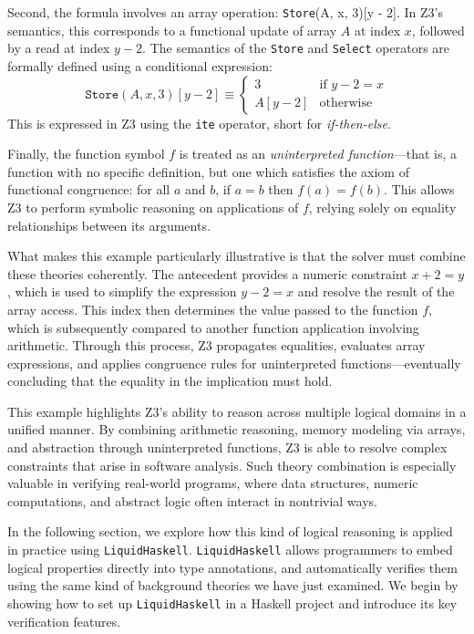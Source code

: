\documentclass[]{rptuseminar}
\begin{document}
Second, the formula involves an array operation: \texttt{Store}(A, x, 3)[y - 2]. In Z3’s semantics, this corresponds to a functional update of array \(A\) at index \(x\), followed by a read at index \(y - 2\). The semantics of the \texttt{Store} and \texttt{Select} operators are formally defined using a conditional expression:
\[
    \texttt{Store}(A, x, 3)[y - 2] \equiv 
    \begin{cases}
    3 & \text{if } y - 2 = x \\
    A[y - 2] & \text{otherwise}
    \end{cases}
\]
This is expressed in Z3 using the \texttt{ite} operator, short for \emph{if-then-else}.

Finally, the function symbol \(f\) is treated as an \emph{uninterpreted function}—that is, a function with no specific definition, but one which satisfies the axiom of functional congruence: for all \(a\) and \(b\), if \(a = b\) then \(f(a) = f(b)\). This allows Z3 to perform symbolic reasoning on applications of \(f\), relying solely on equality relationships between its arguments.

What makes this example particularly illustrative is that the solver must combine these theories coherently. The antecedent provides a numeric constraint \(x + 2 = y\), which is used to simplify the expression \(y - 2 = x\) and resolve the result of the array access. This index then determines the value passed to the function \(f\), which is subsequently compared to another function application involving arithmetic. Through this process, Z3 propagates equalities, evaluates array expressions, and applies congruence rules for uninterpreted functions—eventually concluding that the equality in the implication must hold.



This example highlights Z3's ability to reason across multiple logical domains in a unified manner. By combining arithmetic reasoning, memory modeling via arrays, and abstraction through uninterpreted functions, Z3 is able to resolve complex constraints that arise in software analysis. Such theory combination is especially valuable in verifying real-world programs, where data structures, numeric computations, and abstract logic often interact in nontrivial ways.

In the following section, we explore how this kind of logical reasoning is applied in practice using \texttt{LiquidHaskell}.
\texttt{LiquidHaskell} allows programmers to embed logical properties directly into type annotations, and automatically verifies them using the same kind of background theories we have just examined. We begin by showing how to set up \texttt{LiquidHaskell} in a Haskell project and introduce its key verification features.
\end{document}
